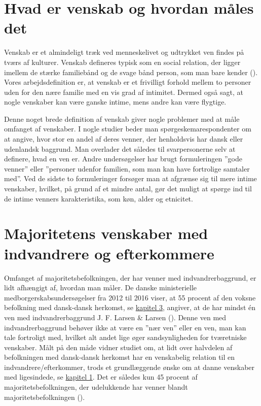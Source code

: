 \documentclass[
]{book}
\begin{document}
\section{Hvad er venskab og hvordan måles det}\label{hvad-er-venskab-og-hvordan-muxe5les-det}

Venskab er et almindeligt træk ved menneskelivet og udtrykket ven findes på tværs af kulturer. Venskab defineres typisk som en social relation, der ligger imellem de stærke familiebånd og de svage bånd person, som man bare kender (). Vores arbejdsdefinition er, at venskab er et frivilligt forhold mellem to personer uden for den nære familie med en vis grad af intimitet. Dermed også sagt, at nogle venskaber kan være ganske intime, mens andre kan være flygtige.

Denne noget brede definition af venskab giver nogle problemer med at måle omfanget af venskaber. I nogle studier beder man spørgeskemarespondenter om at angive, hvor stor en andel af deres venner, der henholdsvis har dansk eller udenlandsk baggrund. Man overlader det således til svarpersonerne selv at definere, hvad en ven er. Andre undersøgelser har brugt formuleringen ''gode venner'' eller ''personer udenfor familien, som man kan have fortrolige samtaler med''. Ved de sidste to formuleringer forsøger man at afgrænse sig til mere intime venskaber, hvilket, på grund af et mindre antal, gør det muligt at spørge ind til de intime venners karakteristika, som køn, alder og etnicitet.

\section{Majoritetens venskaber med indvandrere og efterkommere}\label{majoritetens-venskaber-med-indvandrere-og-efterkommere}

Omfanget af majoritetsbefolkningen, der har venner med indvandrerbaggrund, er lidt afhængigt af, hvordan man måler. De danske ministerielle medborgerskabsundersøgelser fra 2012 til 2016 viser, at 55 procent af den voksne befolkning med dansk-dansk herkomst, se \hyperref[kap3]{kapitel 3}, angiver, at de har mindst én ven med indvandrerbaggrund J. F. Larsen \& Larsen (). Denne ven med indvandrerbaggrund behøver ikke at være en ''nær ven'' eller en ven, man kan tale fortroligt med, hvilket alt andet lige øger sandsynligheden for tværetniske venskaber. Målt på den måde vidner studiet om, at lidt over halvdelen af befolkningen med dansk-dansk herkomst har en venskabelig relation til en indvandrere/efterkommer, trods et grundlæggende ønske om at danne venskaber med ligesindede, se \hyperref[kap1]{kapitel 1}. Det er således kun 45 procent af majoritetsbefolkningen, der udelukkende har venner blandt majoritetsbefolkningen ().
\end{document}
